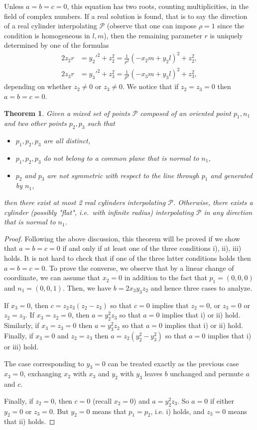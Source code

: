 \documentclass[5p]{elsarticle}
\newtheorem{thm}{Theorem}
\newcommand\Pc{\mathcal P}
\newcommand{\com}[1]{{\color{black} #1}}
\begin{document}
Unless $a=b=c=0$, this equation has two roots, counting multiplicities, in the field of complex numbers.  If a real solution is found, that is to say the direction of a real cylinder interpolating $\Pc$ (observe that one can impose $\rho=1$ since the condition is homogeneous in $l,m$), then the remaining parameter $r$ is uniquely determined by  
one of the formulas
\begin{align}\label{eq:z0}
	2z_2r&=y_2'^2 + z_2^2=\frac{1}{\rho^2}\left(- x_2m+ y_2l \right)^2+z_2^2, \\
	 2z_3r&=y_3'^2+z_3^2=\frac{1}{\rho^2}\left(- x_3m+ y_3l \right)^2 + z_3^2,	
\end{align}
depending \com{on} whether $z_2\neq 0$ or $z_3\neq 0$. We notice that if $z_2=z_3=0$ then $a=b=c=0$. 

\begin{thm}\label{thm:cyl1N2P} Given a mixed set of points $\Pc$ composed of an oriented point $p_1, n_1$ and two other points $p_2,p_3$ such that 
	\begin{itemize}
		\item[i)] $p_1,p_2,p_3$ are all distinct,
		\item[ii)] $p_1,p_2,p_3$ do not belong to \com{a common plane that} is normal to $n_1$,
		\item[iii)] $p_2$ and $p_3$ are not symmetric with respect to the line through $p_1$ and generated by $n_1$, 
	\end{itemize} 
then there exist at most 2 real cylinders interpolating $\Pc$. Otherwise, \com{there exists} a cylinder (possibly "flat", i.e.~with infinite radius) interpolating $\Pc$ in any direction \com{that} is normal to $n_1$.
\end{thm}
\begin{proof}
Following the above discussion, this theorem will be proved if we show that $a=b=c=0$ if and only if at least one of the three conditions i), ii), iii) holds. It is not hard to check that if one of the three latter conditions holds then $a=b=c=0$. To prove the converse, we observe that by a linear change of coordinate, we can assume that $x_2=0$ in addition to the fact that $p_1=(0,0,0)$ and $n_1=(0,0,1)$. Then, we have $b=2x_3y_3z_2$ and hence three cases to analyze. 


If $x_3=0$, then $c=z_2z_3(z_2-z_3)$ so that $c=0$ implies that $z_2=0$, or $z_3=0$ or $z_2=z_3$. If $x_3=z_2=0$, then $a=y_2^2z_3$ so that $a=0$ implies that i) or ii) hold. Similarly, if $x_3=z_3=0$ then $a=y_3^2z_2$ so that $a=0$ implies that i) or ii) hold. Finally, if $x_3=0$ and $z_2=z_3$ then 
$a=z_2(y_2^2-y_3^2)$ so that $a=0$ implies that i) or iii) hold.  

The case corresponding to $y_3=0$ can be treated exactly as the previous case $x_3=0$,  exchanging $x_2$ with $x_3$ and $y_2$ with $y_3$ \com{leaves $b$ unchanged}  and permute $a$ and $c$.

Finally, if $z_2=0$, then $c=0$ (recall $x_2=0$) and $a=y_2^2z_3$. So $a=0$ if either $y_2=0$ or $z_3=0$. But $y_2=0$ means that $p_1=p_2$, i.e. i) holds, and $z_3=0$ means that ii) holds. 	
\end{proof}
\end{document}
